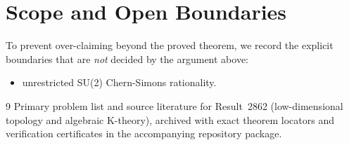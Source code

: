 \documentclass[10pt,reqno]{amsart}
\theoremstyle{definition}
\begin{document}
\section{Scope and Open Boundaries}

To prevent over-claiming beyond the proved theorem, we record the explicit boundaries that are \emph{not} decided by the argument above:
\begin{itemize}
  \item unrestricted SU(2) Chern-Simons rationality.
\end{itemize}

\begin{thebibliography}{9}
Primary problem list and source literature for Result~2862 (low-dimensional topology and algebraic K-theory), archived with exact theorem locators and verification certificates in the accompanying repository package.
\end{thebibliography}
\end{document}
